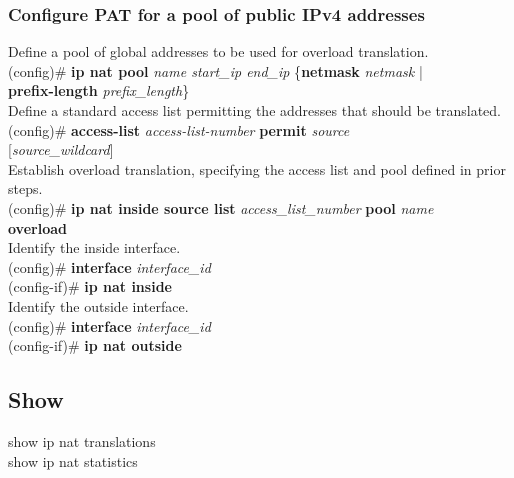 \subsubsection*{Configure PAT for a pool of public IPv4 addresses}
\textrm{Define a pool of global addresses to be used for overload translation.}\\
(config)\# \textbf{ip nat pool} \textit{name start\_ip end\_ip} \{\textbf{netmask} \textit{netmask} | \\\textbf{prefix-length} \textit{prefix\_length}\}\vspace{11pt}\\
\textrm{Define a standard access list permitting the addresses that should be translated.}\\
(config)\# \textbf{access-list} \textit{access-list-number} \textbf{permit} \textit{source} \\{[\textit{source\_wildcard}]}\vspace{11pt}\\
\textrm{Establish overload translation, specifying the access list and pool defined in prior steps.}\\
(config)\# \textbf{ip nat inside source list} \textit{access\_list\_number} \textbf{pool} \textit{name} \\\textbf{overload}\vspace{11pt}\\
\textrm{Identify the inside interface.}\\
(config)\# \textbf{interface} \textit{interface\_id}\\
(config-if)\# \textbf{ip nat inside}\vspace{11pt}\\
\textrm{Identify the outside interface.}\\
(config)\# \textbf{interface} \textit{interface\_id}\\
(config-if)\# \textbf{ip nat outside}
\subsection*{Show}
show ip nat translations\\
show ip nat statistics
